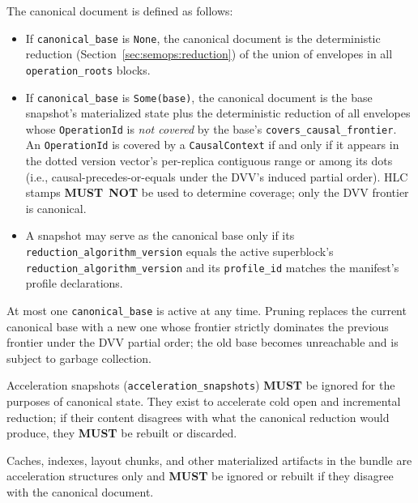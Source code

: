 \documentclass[11pt,letterpaper]{report}
\newcounter{requirement}[chapter]
\newcommand{\MUST}{\textbf{MUST}}
\newcommand{\MUSTNOT}{\textbf{MUST}\nobreak\ \textbf{NOT}}
\begin{document}
\begin{requirement}
  \label{req:format:canonical-document-reduction}
  The canonical document is defined as follows:

  \begin{itemize}
    \item If \texttt{canonical\_base} is \texttt{None}, the
      canonical document is the deterministic reduction
      (Section~\ref{sec:semops:reduction}) of the union of
      envelopes in all \texttt{operation\_roots} blocks.
    \item If \texttt{canonical\_base} is \texttt{Some(base)}, the
      canonical document is the base snapshot's materialized
      state plus the deterministic reduction of all envelopes
      whose \texttt{OperationId} is \emph{not covered} by the
      base's \texttt{covers\_causal\_frontier}. An
      \texttt{OperationId} is covered by a \texttt{CausalContext}
      if and only if it appears in the dotted version vector's
      per-replica contiguous range or among its dots (i.e.,
      causal-precedes-or-equals under the DVV's induced partial
      order). HLC stamps \MUSTNOT{} be used to determine
      coverage; only the DVV frontier is canonical.
    \item A snapshot may serve as the canonical base only if its
      \texttt{reduction\_algorithm\_version} equals the active
      superblock's \texttt{reduction\_algorithm\_version} and its
      \texttt{profile\_id} matches the manifest's profile
      declarations.
  \end{itemize}

  At most one \texttt{canonical\_base} is active at any time.
  Pruning replaces the current canonical base with a new one
  whose frontier strictly dominates the previous frontier under
  the DVV partial order; the old base becomes unreachable and
  is subject to garbage collection.

  Acceleration snapshots (\texttt{acceleration\_snapshots}) \MUST{}
  be ignored for the purposes of canonical state. They exist to
  accelerate cold open and incremental reduction; if their content
  disagrees with what the canonical reduction would produce, they
  \MUST{} be rebuilt or discarded.

  Caches, indexes, layout chunks, and other materialized artifacts
  in the bundle are acceleration structures only and \MUST{} be
  ignored or rebuilt if they disagree with the canonical document.
\end{requirement}
\end{document}
